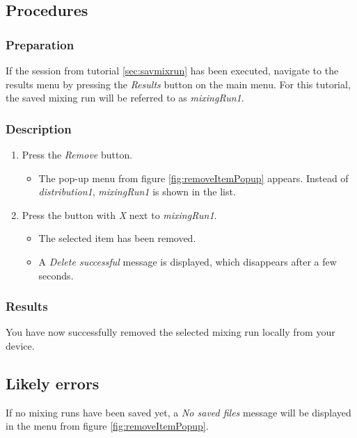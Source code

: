 \subsection{Procedures}

\subsubsection{Preparation}
If the session from tutorial \ref{sec:savmixrun} has been executed, navigate to the results menu by pressing the \emph{Results} button on the main menu.
For this tutorial, the saved mixing run will be referred to as \emph{mixingRun1}.

\subsubsection{Description}
\begin{enumerate}
	\item Press the \emph{Remove} button.
		\begin{itemize}
			\item The pop-up menu from figure \ref{fig:removeItemPopup} appears. Instead of \emph{distribution1}, \emph{mixingRun1} is shown in the list.
		\end{itemize}
	\item Press the button with \emph{X} next to \emph{mixingRun1}.
		\begin{itemize}
			\item The selected item has been removed.
			\item A \emph{Delete successful} message is displayed, which disappears after a few seconds.
		\end{itemize}
\end{enumerate}

\subsubsection{Results}
You have now successfully removed the selected mixing run locally from your device.

\subsection{Likely errors}
If no mixing runs have been saved yet, a \emph{No saved files} message will be displayed in the menu from figure \ref{fig:removeItemPopup}.



